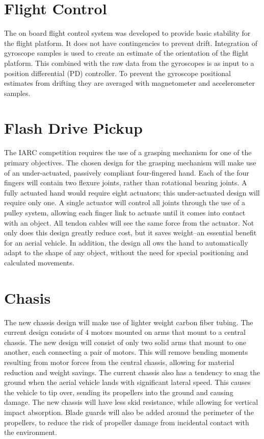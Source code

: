 \documentclass[12pt,letterpaper]{article}
\begin{document}
\section{Flight Control}
The on board flight control system was developed to provide basic
stability for the flight platform. It does not have contingencies to prevent
drift. Integration of gyroscope samples is used to create an estimate of the
orientation of the flight platform. This combined with the raw data from the
gyroscopes is as input to a position differential (PD) controller. To prevent
the gyroscope positional estimates from drifting they are averaged with 
magnetometer and accelerometer samples.

\section{Flash Drive Pickup}
The IARC competition requires the use of a grasping mechanism for one of the 
primary objectives.  The chosen design for the grasping mechanism will make use 
of an under-actuated, passively compliant four-fingered hand.  Each of the four 
fingers will contain two flexure joints, rather than rotational bearing joints. 
A fully actuated hand would require eight actuators; this under-actuated design 
will require only one.  A single actuator will control all joints through the 
use of a pulley system, allowing each finger link to actuate until it comes into
 contact with an object.  All tendon cables will see the same force from the 
actuator.  Not only does this design greatly reduce cost, but it saves 
weight--an essential benefit for an aerial vehicle.  In addition, the design all
ows the hand to automatically adapt to the shape of any object, without the need
 for special positioning and calculated movements.  

\section{Chasis}
The new chassis design will make use of lighter weight carbon fiber tubing.  The
 current design consists of 4 motors mounted on arms that mount to a central 
chassis.  The new design will consist of only two solid arms that mount to one 
another, each connecting a pair of motors.  This will remove bending moments 
resulting from motor forces from the central chassis, allowing for material 
reduction and weight savings.  The current chassis also has a tendency to snag 
the ground when the aerial vehicle lands with significant lateral speed.  This 
causes the vehicle to tip over, sending its propellers into the ground and 
causing damage.  The new chassis will have less skid resistance, while allowing 
for vertical impact absorption.  Blade guards will also be added around the 
perimeter of the propellers, to reduce the risk of propeller damage from 
incidental contact with the environment.
\end{document}
